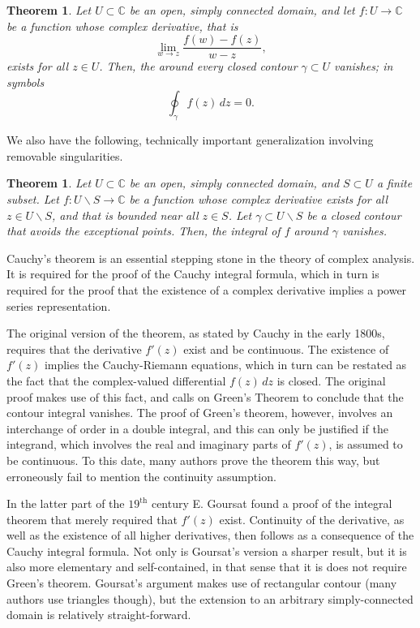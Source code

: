 \documentclass[12pt]{article}
\newcommand{\cnums}{\mathbb{C}}
\newcommand{\supth}{^{\text{th}}}
\newtheorem{theorem}[proposition]{Theorem}
\begin{document}
\begin{theorem}
Let $U\subset\cnums$ be an open, simply connected domain, and let
$f:U\rightarrow \cnums$ be a function whose complex derivative, that is
$$\lim_{w\rightarrow z} \frac{f(w)-f(z)}{w-z},$$
exists for all $z\in U$.
Then, the  around  every closed contour
$\gamma\subset U$ vanishes; in symbols
$$\oint_\gamma f(z)\, dz = 0.$$
\end{theorem}

We also have the following, technically important generalization
involving  removable singularities.
\begin{theorem}
  Let $U\subset\cnums$ be an open, simply connected domain, and
  $S\subset U$ a finite subset. Let $f:U\backslash S \rightarrow
  \cnums$ be a function whose complex derivative exists for all $z\in
  U\backslash S$, and that is bounded near all $z\in S$.  Let $\gamma\subset    
   U\backslash S$ be a closed contour 
  that avoids the exceptional points.  Then, the integral of $f$ around $\gamma$ vanishes.
\end{theorem}


Cauchy's theorem is an essential stepping stone in the theory of
complex analysis. It is required for the proof of the Cauchy integral
formula, which in turn is required for the proof that the existence of
a complex derivative implies a power series representation.

The original version of the theorem, as stated by Cauchy in the early
1800s, requires that the derivative $f'(z)$ exist and be continuous.
The existence of $f'(z)$ implies the Cauchy-Riemann equations, which
in turn can be restated as the fact that the complex-valued
differential $f(z)\, dz$ is closed. The original proof makes use of
this fact, and calls on Green's Theorem to conclude that the contour
integral vanishes. The proof of Green's theorem, however, involves an
interchange of order in a double integral, and this can only be
justified if the integrand, which involves the real and imaginary
parts of $f'(z)$, is assumed to be continuous. To this date, many
authors prove the theorem this way, but erroneously fail to mention
the continuity assumption.

In the latter part of the $19\supth$ century E. Goursat found a proof
of the integral theorem that merely required that $f'(z)$ exist.
Continuity of the derivative, as well as the existence of all higher
derivatives, then follows as a consequence of the Cauchy integral
formula. Not only is Goursat's version a sharper result, but it is
also more elementary and self-contained, in that sense that it is does
not require Green's theorem. Goursat's argument makes use of
rectangular contour (many authors use triangles though), but the
extension to an arbitrary simply-connected domain is relatively
straight-forward.
\end{document}
